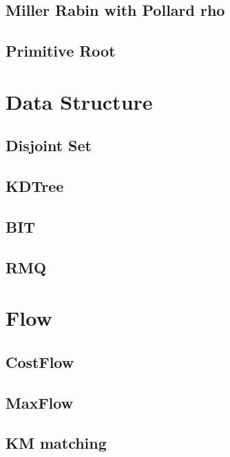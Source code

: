 \subsection{Miller Rabin with Pollard rho}

\subsection{Primitive Root}


\section{Data Structure}
%
\subsection{Disjoint Set}

\subsection{KDTree}

\subsection{BIT}

\subsection{RMQ}


\section{Flow}
\subsection{CostFlow}

\subsection{MaxFlow}

\subsection{KM matching}

